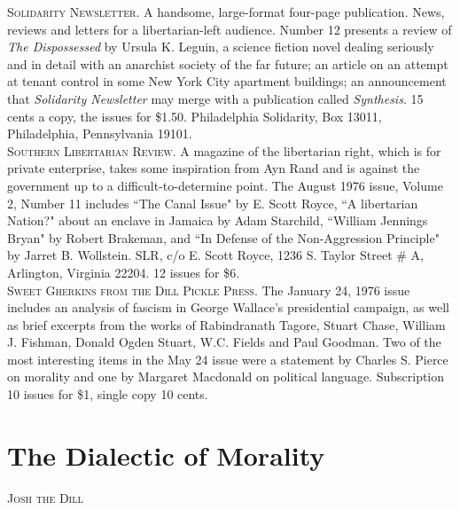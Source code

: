 \documentclass[12pt, onecolumn, letterpaper, oneside]{book}
\makeatletter
\newcommand\chapterauthor[1]{\authortoc{#1}\printchapterauthor{#1}}
\newcommand{\printchapterauthor}[1]{%
  {\parindent0pt\vspace*{-25pt}%
  \linespread{1.1}\large\scshape#1%
  \par\nobreak\vspace*{35pt}}
  \@afterheading%
}
\newcommand{\authortoc}[1]{%
  \addtocontents{toc}{\vskip-10pt}%
  \addtocontents{toc}{%
    \protect\contentsline{chapter}%
    {\hskip1.3em\mdseries\scshape\protect\scriptsize#1}{}{}}
  \addtocontents{toc}{\vskip5pt}%
}
\makeatother
\begin{document}
\noindent\textsc{Solidarity Newsletter.} A handsome, large-format four-page publication. News, reviews and letters for a libertarian-left audience. Number 12 presents a review of \emph{The Dispossessed} by Ursula K. Leguin, a science fiction novel dealing seriously and in detail with an anarchist society of the far future; an article on an attempt at tenant control in some New York City apartment buildings; an announcement that \emph{Solidarity Newsletter} may merge with a publication called \emph{Synthesis}. 15 cents a copy, the issues for \$1.50. Philadelphia Solidarity, Box 13011, Philadelphia, Pennsylvania 19101.\\

\noindent\textsc{Southern Libertarian Review.} A magazine of the libertarian right, which is for private enterprise, takes some inspiration from Ayn Rand and is against the government up to a difficult-to-determine point. The August 1976 issue, Volume 2, Number 11 includes ``The Canal Issue" by E. Scott Royce, ``A libertarian Nation?" about an enclave in Jamaica by Adam Starchild, ``William Jennings Bryan" by Robert Brakeman, and ``In Defense of the Non-Aggression Principle" by Jarret B. Wollstein. SLR, c/o E. Scott Royce, 1236 S. Taylor Street \# A, Arlington, Virginia 22204. 12 issues for \$6.\\

\noindent\textsc{Sweet Gherkins from the Dill Pickle Press.} The January 24, 1976 issue includes an analysis of fascism in George Wallace's presidential campaign, as well as brief excerpts from the works of Rabindranath Tagore, Stuart Chase, William J. Fishman, Donald Ogden Stuart, W.C. Fields and Paul Goodman. Two of the most interesting items in the May 24 issue were a statement by Charles S. Pierce on morality and one by Margaret Macdonald on political language. Subscription 10 issues for \$1, single copy 10 cents. 


\chapter{The Dialectic of Morality}
\chapterauthor{Josh the Dill}
\end{document}
